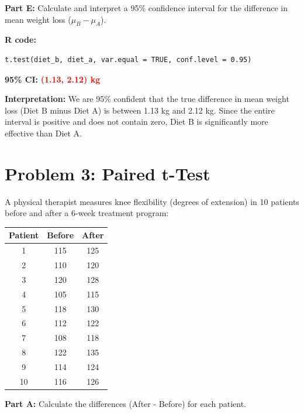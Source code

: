 \documentclass[11pt]{article}
\begin{document}
\vspace{0.5cm}

\textbf{Part E:} Calculate and interpret a 95\% confidence interval for the difference in mean weight loss ($\mu_B - \mu_A$).

\textbf{R code:}
\begin{lstlisting}
t.test(diet_b, diet_a, var.equal = TRUE, conf.level = 0.95)
\end{lstlisting}

\textbf{95\% CI:} \textcolor{red}{\textbf{(1.13, 2.12) kg}}

\textbf{Interpretation:} We are 95\% confident that the true difference in mean weight loss (Diet B minus Diet A) is between 1.13 kg and 2.12 kg. Since the entire interval is positive and does not contain zero, Diet B is significantly more effective than Diet A.

\newpage

\section{Problem 3: Paired t-Test}

A physical therapist measures knee flexibility (degrees of extension) in 10 patients before and after a 6-week treatment program:

\vspace{0.3cm}

\begin{center}
\begin{tabular}{ccc}
\toprule
Patient & Before & After \\
\midrule
1 & 115 & 125 \\
2 & 110 & 120 \\
3 & 120 & 128 \\
4 & 105 & 115 \\
5 & 118 & 130 \\
6 & 112 & 122 \\
7 & 108 & 118 \\
8 & 122 & 135 \\
9 & 114 & 124 \\
10 & 116 & 126 \\
\bottomrule
\end{tabular}
\end{center}

\vspace{6pt}

\textbf{Part A:} Calculate the differences (After - Before) for each patient.
\end{document}
